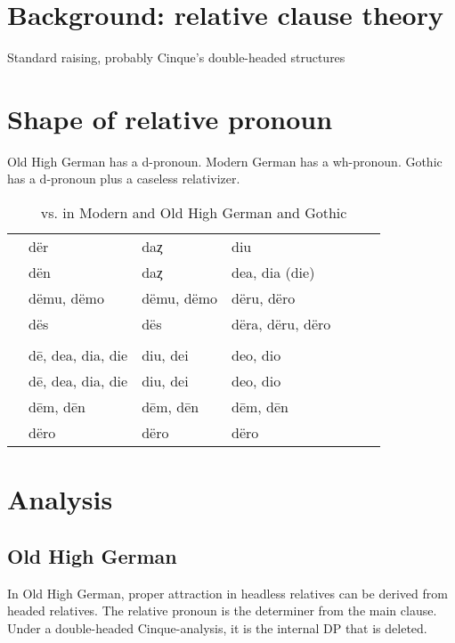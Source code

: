   \section{Background: relative clause theory}
Standard raising, probably Cinque's double-headed structures


  \section{Shape of relative pronoun}
Old High German has a d-pronoun. Modern German has a wh-pronoun. Gothic has a d-pronoun plus a caseless relativizer.


\begin{table}[h]\label{tbl:intextgoth}
	\center
	\caption { vs.  in Modern and Old High German and Gothic}
	\begin{minipage}{\linewidth}
		\begin{tabularx}{\textwidth}{c *{6}{Y}}
		\toprule
			&      &      &           \\
		\midrule
		 & dër       	& daȥ					& diu              \\
			& dën					&	daȥ		      & dea, dia (die)	 \\
			&	dëmu, dëmo	&	dëmu, dëmo	& dëru, dëro			 \\
     & dës         & dës         & dëra, dëru, dëro \\
		\bottomrule
    \toprule
    	&             &       &    \\
    \midrule
     &  dē, dea, dia, die & diu, dei     & deo, dio  \\
     &  dē, dea, dia, die & diu, dei     & deo, dio  \\
     &  dēm, dēn          & dēm, dēn     & dēm, dēn  \\
     &  dëro              & dëro         & dëro      \\
    \bottomrule
		\end{tabularx}
	\end{minipage}
\end{table}




  \section{Analysis}

    \subsection{Old High German}
In Old High German, proper attraction in headless relatives can be derived from headed relatives. The relative pronoun is the determiner from the main clause. Under a double-headed Cinque-analysis, it is the internal DP that is deleted.




